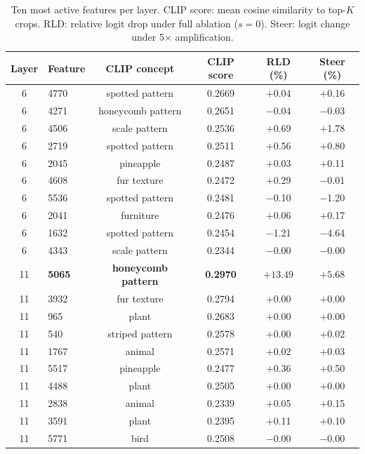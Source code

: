 
\begin{table}[H]
  \centering
  \footnotesize
  \caption{Ten most active features per layer. CLIP score: mean cosine similarity to top-$K$ crops. RLD: relative logit drop under full ablation ($s{=}0$). Steer: logit change under 5$\times$ amplification.}
  \label{tab:feature_results}
  \begin{tabular}{clcccc}
    \toprule
    Layer & Feature & CLIP concept & CLIP score & RLD (\%) & Steer (\%) \\
    \midrule
    6 & 4770 & spotted pattern   & 0.2669 & $+$0.04 & $+$0.16 \\
    6 & 4271 & honeycomb pattern & 0.2651 & $-$0.04 & $-$0.03 \\
    6 & 4506 & scale pattern     & 0.2536 & $+$0.69 & $+$1.78 \\
    6 & 2719 & spotted pattern   & 0.2511 & $+$0.56 & $+$0.80 \\
    6 & 2045 & pineapple         & 0.2487 & $+$0.03 & $+$0.11 \\
    6 & 4608 & fur texture       & 0.2472 & $+$0.29 & $-$0.01 \\
    6 & 5536 & spotted pattern   & 0.2481 & $-$0.10 & $-$1.20 \\
    6 & 2041 & furniture         & 0.2476 & $+$0.06 & $+$0.17 \\
    6 & 1632 & spotted pattern   & 0.2454 & $-$1.21 & $-$4.64 \\
    6 & 4343 & scale pattern     & 0.2344 & $-$0.00 & $-$0.00 \\
    \midrule
    11 & \textbf{5065} & \textbf{honeycomb pattern} & \textbf{0.2970} & $\mathbf{+13.49}$ & $\mathbf{+5.68}$ \\
    11 & 3932 & fur texture       & 0.2794 & $+$0.00 & $+$0.00 \\
    11 & 965  & plant             & 0.2683 & $+$0.00 & $+$0.00 \\
    11 & 540  & striped pattern   & 0.2578 & $+$0.00 & $+$0.02 \\
    11 & 1767 & animal            & 0.2571 & $+$0.02 & $+$0.03 \\
    11 & 5517 & pineapple         & 0.2477 & $+$0.36 & $+$0.50 \\
    11 & 4488 & plant             & 0.2505 & $+$0.00 & $+$0.00 \\
    11 & 2838 & animal            & 0.2339 & $+$0.05 & $+$0.15 \\
    11 & 3591 & plant             & 0.2395 & $+$0.11 & $+$0.10 \\
    11 & 5771 & bird              & 0.2508 & $-$0.00 & $-$0.00 \\
    \bottomrule
  \end{tabular}
\end{table}

